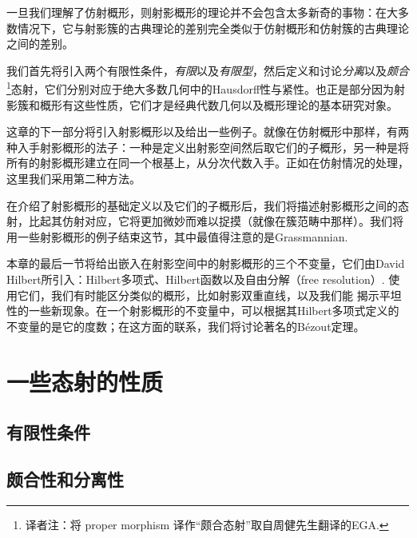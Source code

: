 一旦我们理解了仿射概形，则射影概形的理论并不会包含太多新奇的事物：在大多数情况下，它与射影簇的古典理论的差别完全类似于仿射概形和仿射簇的古典理论之间的差别。

我们首先将引入两个有限性条件，\textit{有限}以及\textit{有限型}，然后定义和讨论\textit{分离}以及\textit{颇合}\footnote{译者注：将 proper morphism 译作“颇合态射”取自周健先生翻译的EGA.}态射，它们分别对应于绝大多数几何中的Hausdorff性与紧性。也正是部分因为射影簇和概形有这些性质，它们才是经典代数几何以及概形理论的基本研究对象。

这章的下一部分将引入射影概形以及给出一些例子。就像在仿射概形中那样，有两种入手射影概形的法子：一种是定义出射影空间然后取它们的子概形，另一种是将所有的射影概形建立在同一个根基上，从分次代数入手。正如在仿射情况的处理，这里我们采用第二种方法。

在介绍了射影概形的基础定义以及它们的子概形后，我们将描述射影概形之间的态射，比起其仿射对应，它将更加微妙而难以捉摸（就像在簇范畴中那样）。我们将用一些射影概形的例子结束这节，其中最值得注意的是Grassmannian.

本章的最后一节将给出嵌入在射影空间中的射影概形的三个不变量，它们由David Hilbert所引入：Hilbert多项式、Hilbert函数以及自由分解（free resolution）. 使用它们，我们有时能区分类似的概形，比如射影双重直线，以及我们能
揭示平坦性的一些新现象。在一个射影概形的不变量中，可以根据其Hilbert多项式定义的不变量的是它的度数；在这方面的联系，我们将讨论著名的B\'{e}zout定理。

\section{一些态射的性质}

\subsection{有限性条件}

\subsection{颇合性和分离性}